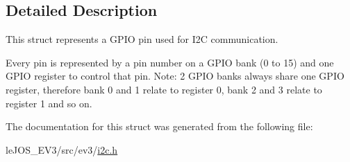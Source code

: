 \subsection{Detailed Description}
This struct represents a G\+P\+I\+O pin used for I2\+C communication. 

Every pin is represented by a pin number on a G\+P\+I\+O bank (0 to 15) and one G\+P\+I\+O register to control that pin. Note\+: 2 G\+P\+I\+O banks always share one G\+P\+I\+O register, therefore bank 0 and 1 relate to register 0, bank 2 and 3 relate to register 1 and so on. 

The documentation for this struct was generated from the following file\+:\begin{DoxyCompactItemize}
\item 
le\+J\+O\+S\+\_\+\+E\+V3/src/ev3/\hyperlink{i2c_8h}{i2c.\+h}\end{DoxyCompactItemize}
